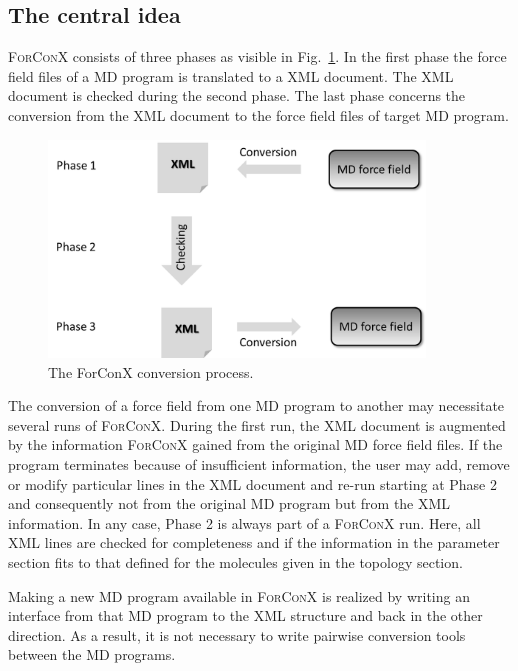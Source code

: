 \documentclass[12pt]{article}
\begin{document}
\subsection{The central idea}
\textsc{ForConX} consists of three phases as visible in Fig.~\ref{fig_phases}.
In the first phase the force field files of a MD program is translated to a XML document. The XML document is checked during the second phase. The last phase concerns
the conversion from the XML document to the force field files of target MD program.
\begin{figure}[bh]
  \centering
  \includegraphics[width=10cm]{./ForConX_ablauf.png}
   \caption{The ForConX conversion process.}
   \label{fig_phases}
\end{figure}

The conversion of a force field from one MD program to another may necessitate several runs of \textsc{ForConX}. During the first run, the XML document is augmented
by the information \textsc{ForConX} gained from the original MD force field files. If the program terminates because of insufficient information, the user may 
add, remove or modify particular lines in the XML document and re-run starting at Phase 2 and consequently not from the original MD program but from the XML 
information. In any case, Phase 2 is always part of a \textsc{ForConX} run. Here, all XML lines are checked for completeness and if the information in the 
parameter section fits to that defined for the molecules given in the topology section.

Making a new MD program available in \textsc{ForConX} is realized by writing an interface from that MD program to the XML structure and back in the other direction.
As a result, it is not necessary to write pairwise conversion tools between the MD programs.

\end{document}

